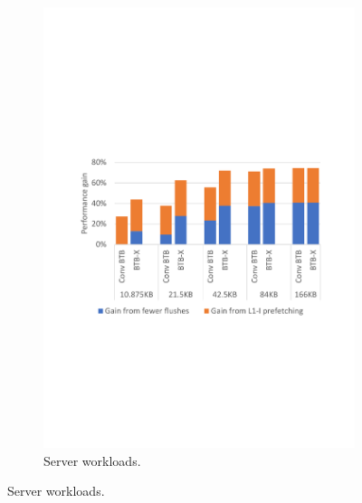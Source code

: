 \begin{figure}
    \centering
    \begin{subfigure}[t]{0.8\columnwidth}
        \centering
        \includegraphics[width=\columnwidth, trim=70 235 60 250, clip]{figures/serverRes3.pdf}
        \caption{Server workloads.}
        \vspace{-0.3in}
        \label{cal:fig:serverPerf}
    \end{subfigure}
    

\end{figure}
